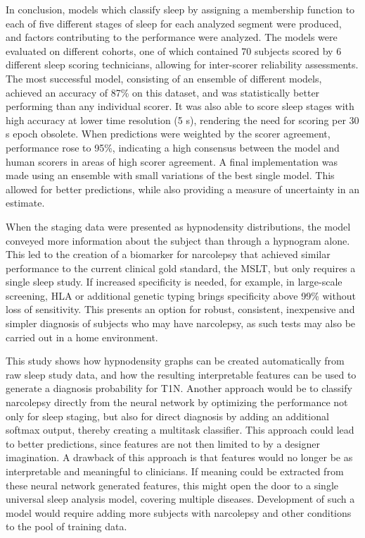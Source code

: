 In conclusion, models which classify sleep by assigning a membership function to each of five different stages of sleep for each analyzed segment were produced, and factors contributing to the performance were analyzed. 
The models were evaluated on different cohorts, one of which contained 70 subjects scored by 6 different sleep scoring technicians, allowing for inter-scorer reliability assessments.
The most successful model, consisting of an ensemble of different models, achieved an accuracy of 87\% on this dataset, and was statistically better performing than any individual scorer.
It was also able to score sleep stages with high accuracy at lower time resolution (5 s), rendering the need for scoring per 30 s epoch obsolete.
When predictions were weighted by the scorer agreement, performance rose to 95\%, indicating a high consensus between the model and human scorers in areas of high scorer agreement.
A final implementation was made using an ensemble with small variations of the best single model.
This allowed for better predictions, while also providing a measure of uncertainty in an estimate.

When the staging data were presented as hypnodensity distributions, the model conveyed more information about the subject than through a hypnogram alone.
This led to the creation of a biomarker for narcolepsy that achieved similar performance to the current clinical gold standard, the MSLT, but only requires a single sleep study.
If increased specificity is needed, for example, in large-scale screening, HLA or additional genetic typing brings specificity above 99\% without loss of sensitivity.
This presents an option for robust, consistent, inexpensive and simpler diagnosis of subjects who may have narcolepsy, as such tests may also be carried out in a home environment.

This study shows how hypnodensity graphs can be created automatically from raw sleep study data, and how the resulting interpretable features can be used to generate a diagnosis probability for T1N.
Another approach would be to classify narcolepsy directly from the neural network by optimizing the performance not only for sleep staging, but also for direct diagnosis by adding an additional softmax output, thereby creating a multitask classifier.
This approach could lead to better predictions, since features are not then limited to by a designer imagination. 
A drawback of this approach is that features would no longer be as interpretable and meaningful to clinicians. 
If meaning could be extracted from these neural network generated features, this might open the door to a single universal sleep analysis model, covering multiple diseases.
Development of such a model would require adding more subjects with narcolepsy and other conditions to the pool of training data.

